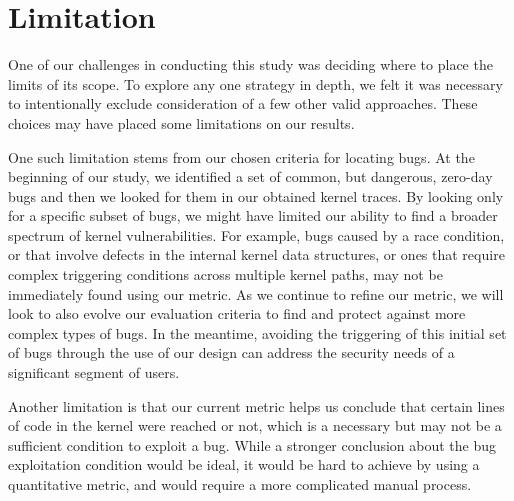 \section{Limitation} 
\label{sec.limitation}

One of our challenges in conducting this study was deciding where to place the
limits of its scope.  To explore any one strategy
in depth, we felt it was necessary to intentionally exclude consideration of
a few other valid approaches. These choices may have placed some limitations on our results.

One such limitation stems from our chosen criteria for locating
bugs. At the beginning
of our study, we identified a set of common, but dangerous, zero-day bugs
and then we looked for them in our obtained kernel traces. By looking only
for a specific subset of bugs, we might have limited our
ability to find a broader spectrum of kernel vulnerabilities. For example, bugs
caused by a race condition, or that involve defects in the internal kernel data
structures, or ones that require complex triggering conditions across multiple kernel
paths, may not be immediately found using our metric. As we continue to refine
our metric, we will look to also evolve our evaluation
criteria to find and protect against more complex types of bugs. 
In the meantime, avoiding the triggering of this initial set of bugs
through the use of our \lip design can address the security
needs of a significant segment of users. 

Another limitation is that our current metric helps us conclude that certain lines of code in 
the kernel were reached or not, which is a necessary but may not be a sufficient condition 
to exploit a bug. While a stronger conclusion about the bug exploitation condition would be ideal, 
it would be hard to achieve by using a quantitative metric, and would require a more complicated manual process. 
